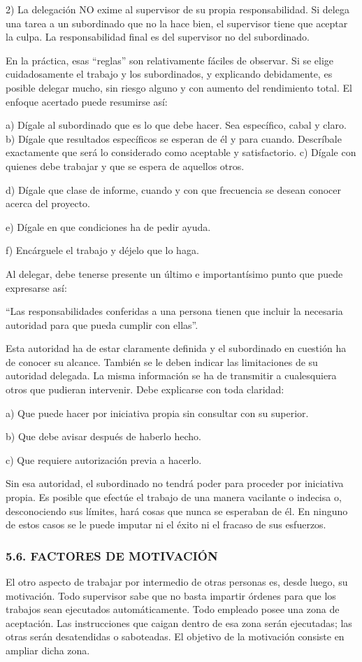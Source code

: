 2) La delegación NO exime al supervisor de su propia responsabilidad. Si delega una tarea a un subordinado que no la hace bien, el supervisor tiene que aceptar la culpa. La responsabilidad final es del supervisor no del subordinado.

En la práctica, esas “reglas” son relativamente fáciles de observar. Si se elige cuidadosamente el trabajo y los subordinados, y explicando debidamente, es posible delegar mucho, sin riesgo alguno y con aumento del rendimiento total. El enfoque acertado puede resumirse así:

a) Dígale al subordinado que es lo que debe hacer. Sea específico, cabal y claro. b) Dígale que resultados específicos se esperan de él y para cuando. Descríbale exactamente que será lo considerado como aceptable y satisfactorio. c) Dígale con quienes debe trabajar y que se espera de aquellos otros.

d) Dígale que clase de informe, cuando y con que frecuencia se desean conocer acerca del proyecto.

e) Dígale en que condiciones ha de pedir ayuda.

f) Encárguele el trabajo y déjelo que lo haga.

Al delegar, debe tenerse presente un último e importantísimo punto que puede expresarse así:

“Las responsabilidades conferidas a una persona tienen que incluir la necesaria autoridad para que pueda cumplir con ellas”.



Esta autoridad ha de estar claramente definida y el subordinado en cuestión ha de conocer su alcance. También se le deben indicar las limitaciones de su autoridad delegada. La misma información se ha de transmitir a cualesquiera otros que pudieran intervenir. Debe explicarse con toda claridad:

a) Que puede hacer por iniciativa propia sin consultar con su superior.

b) Que debe avisar después de haberlo hecho.

c) Que requiere autorización previa a hacerlo.

Sin esa autoridad, el subordinado no tendrá poder para proceder por iniciativa propia. Es posible que efectúe el trabajo de una manera vacilante o indecisa o, desconociendo sus límites, hará cosas que nunca se esperaban de él. En ninguno de estos casos se le puede imputar ni el éxito ni el fracaso de sus esfuerzos.

\subsubsection*{5.6. FACTORES DE MOTIVACIÓN}
El otro aspecto de trabajar por intermedio de otras personas es, desde luego, su motivación. Todo supervisor sabe que no basta impartir órdenes para que los trabajos sean ejecutados automáticamente. Todo empleado posee una zona de aceptación. Las instrucciones que caigan dentro de esa zona serán ejecutadas; las otras serán desatendidas o saboteadas. El objetivo de la motivación consiste en ampliar dicha zona.

